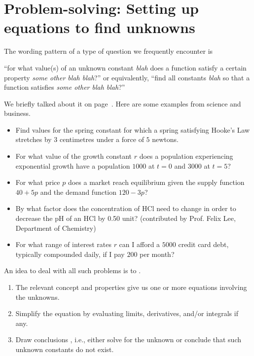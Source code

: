 \documentclass[../main.tex]{subfiles}
\begin{document}
\section{Problem-solving: Setting up equations to find unknowns} \label{sec:working-with-equations}

The wording pattern of a type of question we frequently encounter is

\begin{mdframed}[style=simple-compact]
  ``for what value(s) of an unknown constant \emph{blah} does a function satisfy a certain property \emph{some other blah blah}?'' or equivalently, ``find all constants \emph{blah} so that a function satisfies \emph{some other blah blah}?''
\end{mdframed}

We briefly talked about it on page~\pageref{eg:piecewise-abs-of-function}. Here are some examples from science and business.
\begin{itemize}
  \item Find values for the spring constant for which a spring satisfying Hooke's Law stretches by \(3\) centimetres under a force of \(5\) newtons.
  \item For what value of the growth constant \(r\) does a population experiencing exponential growth have a population \(1000\) at \(t = 0\) and \(3000\) at \(t = 5\)?
  \item For what price \(p\) does a market reach equilibrium given the supply function \(40 + 5p\) and the demand function \(120 - 3p\)?
  \item By what factor does the concentration of HCl need to change in order to decrease the pH of an HCl by 0.50 unit? \hfill{} (contributed by Prof. Felix Lee, Department of Chemistry)
  \item For what range of interest rates \(r\) can I afford a \textdollar\(5000\) credit card debt, typically compounded daily, if I pay \textdollar{}\(200\) per month?
\end{itemize}
\bigskip

\faStar{} An idea to deal with all such problems is to .
\begin{enumerate}
  \item The relevant concept and properties give us one or more equations involving the unknowns.
  \item Simplify the equation by evaluating limits, derivatives, and/or integrals if any.
  \item Draw conclusions , i.e., either solve for the unknown or conclude that such unknown constants do not exist.
\end{enumerate}
\end{document}
